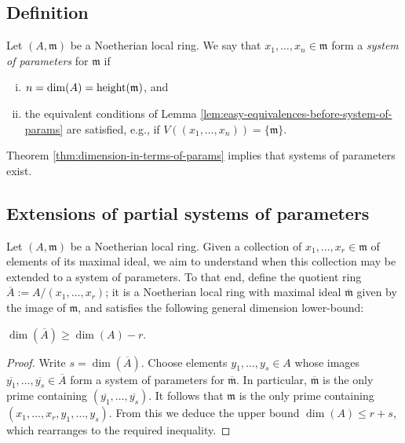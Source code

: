 \documentclass[reqno]{amsart}
\begin{document}
\subsection{Definition}
\label{sec:org9e31ea4}

\begin{definition}
  Let $(A,\mathfrak{m})$ be a Noetherian local ring.
  We say that $x_1,\dotsc,x_n \in \mathfrak{m}$
  form a \emph{system of parameters}
  for $\mathfrak{m}$
  if
  \begin{enumerate}[(i)]
  \item $n = \dim(A) = \operatorname{height}(\mathfrak{m})$,
    and
  \item   the equivalent conditions of
    Lemma
    \ref{lem:easy-equivalences-before-system-of-params}
    are
    satisfied,
    e.g., if $V((x_1,\dotsc,x_n)) = \{\mathfrak{m}\}$.
  \end{enumerate}
\end{definition}
Theorem \ref{thm:dimension-in-terms-of-params} implies
that systems of parameters exist.

\subsection{Extensions of partial systems of parameters}
\label{sec:orgdc48040}

Let \((A,\mathfrak{m})\) be a Noetherian local ring.
Given a collection of \(x_1,\dotsc,x_r \in \mathfrak{m}\) of elements of its maximal ideal,
we aim to understand when this collection may be extended
to a system of parameters.
To that end, define the quotient ring
\(\overline{A} := A / (x_1,\dotsc,x_r)\);
it is a Noetherian local ring with maximal ideal
\(\overline{\mathfrak{m}}\) given by the image of \(\mathfrak{m}\),
and satisfies the following general dimension lower-bound:
\begin{lemma}\label{lem:lower-bound-dimension-quotient-by-r-gens}
  $\dim(\overline{A}) \geq \dim(A) - r$.
\end{lemma}
\begin{proof}
  Write $s = \dim(\overline{A})$.
  Choose elements $y_1,\dotsc,y_s \in A$
  whose images $\overline{y_1},\dotsc,\overline{y_s} \in
  \overline{A}$
  form a system of parameters for $\overline{\mathfrak{m}}$.
  In particular,
  $\overline{\mathfrak{m}}$
  is the only prime containing
  $(\overline{y_1},\dotsc,\overline{y_s})$.
  It follows that
  $\mathfrak{m}$ is the only prime containing
  $(x_1,\dotsc,x_r,y_1,\dotsc,y_s)$.
  From this we deduce the upper bound $\dim(A) \leq r + s$,
  which rearranges to the required inequality.
\end{proof}
\end{document}
